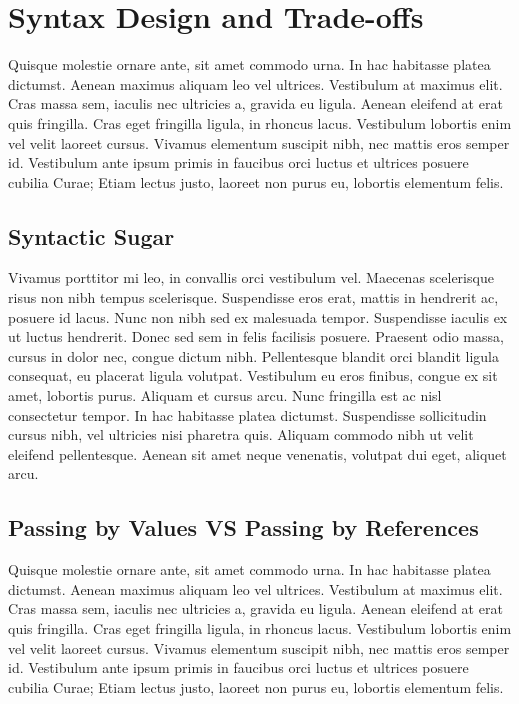 \section{Syntax Design and Trade-offs}
Quisque molestie ornare ante, sit amet commodo urna. In hac habitasse platea dictumst. Aenean maximus aliquam leo vel ultrices. Vestibulum at maximus elit. Cras massa sem, iaculis nec ultricies a, gravida eu ligula. Aenean eleifend at erat quis fringilla. Cras eget fringilla ligula, in rhoncus lacus. Vestibulum lobortis enim vel velit laoreet cursus. Vivamus elementum suscipit nibh, nec mattis eros semper id. Vestibulum ante ipsum primis in faucibus orci luctus et ultrices posuere cubilia Curae; Etiam lectus justo, laoreet non purus eu, lobortis elementum felis.

\subsection{Syntactic Sugar}
Vivamus porttitor mi leo, in convallis orci vestibulum vel. Maecenas scelerisque risus non nibh tempus scelerisque. Suspendisse eros erat, mattis in hendrerit ac, posuere id lacus. Nunc non nibh sed ex malesuada tempor. Suspendisse iaculis ex ut luctus hendrerit. Donec sed sem in felis facilisis posuere. Praesent odio massa, cursus in dolor nec, congue dictum nibh. Pellentesque blandit orci blandit ligula consequat, eu placerat ligula volutpat. Vestibulum eu eros finibus, congue ex sit amet, lobortis purus. Aliquam et cursus arcu. Nunc fringilla est ac nisl consectetur tempor. In hac habitasse platea dictumst. Suspendisse sollicitudin cursus nibh, vel ultricies nisi pharetra quis. Aliquam commodo nibh ut velit eleifend pellentesque. Aenean sit amet neque venenatis, volutpat dui eget, aliquet arcu.

\subsection{Passing by Values VS Passing by References}
Quisque molestie ornare ante, sit amet commodo urna. In hac habitasse platea dictumst. Aenean maximus aliquam leo vel ultrices. Vestibulum at maximus elit. Cras massa sem, iaculis nec ultricies a, gravida eu ligula. Aenean eleifend at erat quis fringilla. Cras eget fringilla ligula, in rhoncus lacus. Vestibulum lobortis enim vel velit laoreet cursus. Vivamus elementum suscipit nibh, nec mattis eros semper id. Vestibulum ante ipsum primis in faucibus orci luctus et ultrices posuere cubilia Curae; Etiam lectus justo, laoreet non purus eu, lobortis elementum felis.


